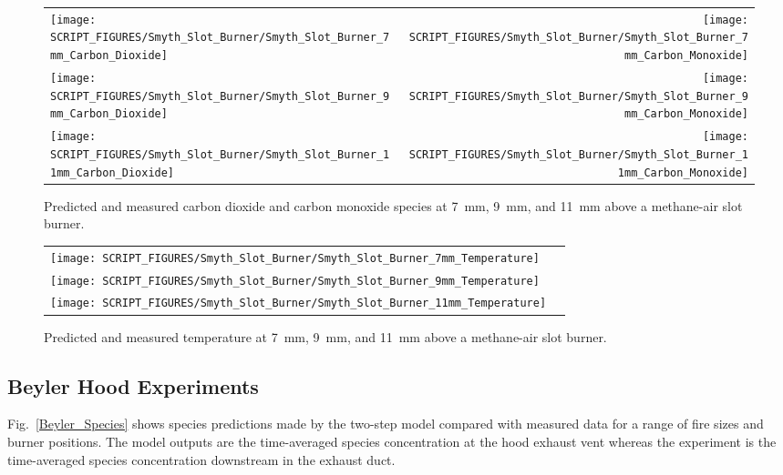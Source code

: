 \begin{figure}[p]
\begin{tabular*}{\textwidth}{l@{\extracolsep{\fill}}r}
\texttt{[image: SCRIPT\_FIGURES/Smyth\_Slot\_Burner/Smyth\_Slot\_Burner\_7mm\_Carbon\_Dioxide]} &
\texttt{[image: SCRIPT\_FIGURES/Smyth\_Slot\_Burner/Smyth\_Slot\_Burner\_7mm\_Carbon\_Monoxide]} \\
\texttt{[image: SCRIPT\_FIGURES/Smyth\_Slot\_Burner/Smyth\_Slot\_Burner\_9mm\_Carbon\_Dioxide]} &
\texttt{[image: SCRIPT\_FIGURES/Smyth\_Slot\_Burner/Smyth\_Slot\_Burner\_9mm\_Carbon\_Monoxide]} \\
\texttt{[image: SCRIPT\_FIGURES/Smyth\_Slot\_Burner/Smyth\_Slot\_Burner\_11mm\_Carbon\_Dioxide]} &
\texttt{[image: SCRIPT\_FIGURES/Smyth\_Slot\_Burner/Smyth\_Slot\_Burner\_11mm\_Carbon\_Monoxide]} 
\end{tabular*}
\caption[Carbon monoxide and carbons dioxide species predictions at 7~mm, 9~mm, and 11~mm above burner, Smyth experiment]
{Predicted and measured carbon dioxide and carbon monoxide species at 7~mm, 9~mm, and 11~mm above a methane-air slot burner.}
\label{Smyth_Slot_Burner_co_co2}
\end{figure}

\begin{figure}[p]
\begin{tabular*}{\textwidth}{l@{\extracolsep{\fill}}r}
\texttt{[image: SCRIPT\_FIGURES/Smyth\_Slot\_Burner/Smyth\_Slot\_Burner\_7mm\_Temperature]} \\
\texttt{[image: SCRIPT\_FIGURES/Smyth\_Slot\_Burner/Smyth\_Slot\_Burner\_9mm\_Temperature]} \\
\texttt{[image: SCRIPT\_FIGURES/Smyth\_Slot\_Burner/Smyth\_Slot\_Burner\_11mm\_Temperature]}
\end{tabular*}
\caption[Temperature predictions at 7~mm, 9~mm, and 11~mm above burner, Smyth experiment]
{Predicted and measured temperature at 7~mm, 9~mm, and 11~mm above a methane-air slot burner.}
\label{Smyth_Slot_Burner_temp}
\end{figure}

\clearpage

\subsection{Beyler Hood Experiments}

Fig.~\ref{Beyler_Species} shows species predictions made by the two-step model compared with measured data for a range of fire sizes and burner positions.  The model outputs are the time-averaged species concentration at the hood exhaust vent whereas the experiment is the time-averaged species concentration downstream in the exhaust duct.


